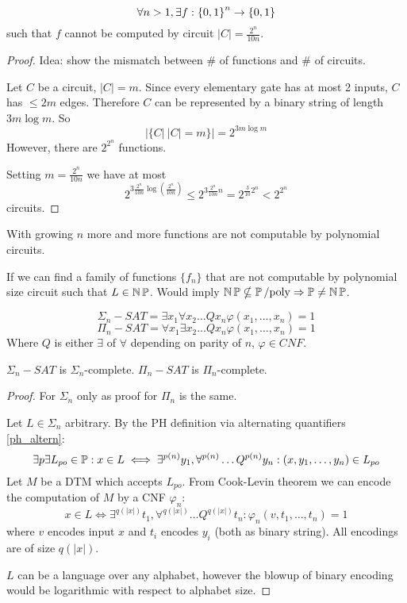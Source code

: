 \begin{theorem}
	\[ \forall n > 1, \exists f: \operatorname{\{ 0, 1 \}}^n \to \operatorname{\{ 0, 1 \}} \]
	such that $f$ cannot be computed by circuit $|C| = \frac{2^n}{10n}$.
\end{theorem}
\begin{proof}
	Idea: show the mismatch between \# of functions and \# of circuits.

	Let $C$ be a circuit, $|C| = m$.
	Since every elementary gate has at most 2 inputs, $C$ has $\leq 2m$ edges.
	Therefore $C$ can be represented by a binary string of length $3m \log m$.
	So
	\[ |\{ C |\ |C| = m \}| = 2^{3m \log m} \]
	However, there are $2^{2^n}$ functions.

	Setting $m = \frac{2^n}{10n}$ we have at most
	\[ 2^{3 \frac{2^n}{10n} \log (\frac{2^n}{10n})} \leq 2^{3 \frac{2^n}{10n} n} = 2^{\frac{3}{10} 2^n} < 2^{2^n} \]
	circuits.
\end{proof}

\begin{consequence}
	With growing $n$ more and more functions are not computable by polynomial circuits.
\end{consequence}

\begin{note}
	If we can find a family of functions $\{ f_n\}$ that are not computable by polynomial size circuit such that $L \in \operatorname{\operatorname{\mathbb{N}}\mathbb{P}}$.
	Would imply $\operatorname{\operatorname{\mathbb{N}}\mathbb{P}} \nsubseteq \operatorname{\operatorname{\mathbb{P}}/poly} \Rightarrow \operatorname{\mathbb{P}} \neq \operatorname{\operatorname{\mathbb{N}}\mathbb{P}}$.
\end{note}

\begin{definition}
	\[ \Sigma_n-SAT = \exists x_1 \forall x_2 \ldots Q x_n \varphi(x_1, \ldots, x_n) = 1 \]
	\[ \Pi_n-SAT = \forall x_1 \exists x_2 \ldots Q x_n \varphi(x_1, \ldots, x_n) = 1 \]
	Where $Q$ is either $\exists$ of $\forall$ depending on parity of $n$, $\varphi \in CNF$.
\end{definition}

\begin{lemma}
	$\Sigma_n-SAT$ is $\Sigma_n$-complete.
	$\Pi_n-SAT$ is $\Pi_n$-complete.
\end{lemma}
\begin{proof}
	For $\Sigma_n$ only as proof for $\Pi_n$ is the same.

	Let $L \in \Sigma_n$ arbitrary.
	By the PH definition via alternating quantifiers \cref{ph_altern}:
	\[ \exists p \exists L_{po} \in \operatorname{\mathbb{P}}: x \in L \iff \exists^{p(n)} y_1, \forall^{p(n)} \ldots Q^{p(n)} y_n: (x, y_1, \ldots, y_n) \in L_{po} \]
	Let $M$ be a DTM which accepts $L_{po}$.
	From Cook-Levin theorem we can encode the computation of $M$ by a CNF $\varphi_n$:
	\[ x \in L \iff \exists^{q(|x|)} t_1, \forall^{q(|x|)} \ldots Q^{q(|x|)} t_n: \varphi_n(v, t_1, \ldots, t_n) = 1 \]
	where $v$ encodes input $x$ and $t_i$ encodes $y_i$ (both as binary string).
	All encodings are of size $q(|x|)$.

	$L$ can be a language over any alphabet, however the blowup of binary encoding would be logarithmic with respect to alphabet size.
\end{proof}

